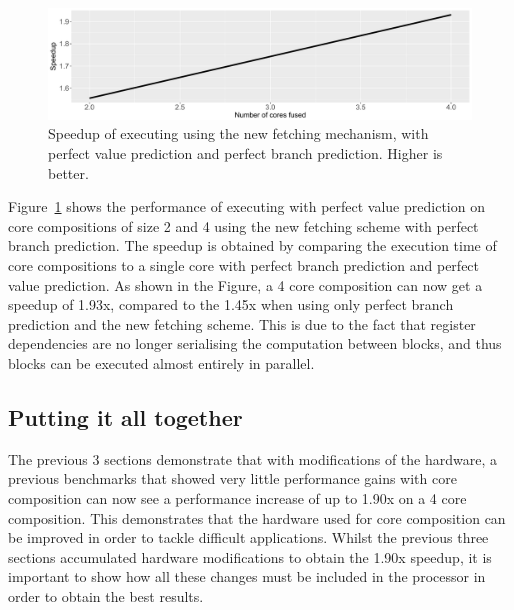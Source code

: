 \begin{figure}[t]
    \centering
    \includegraphics[width=1\textwidth]{chapter3/graphics/mser_fetch_motiv.pdf}

    \caption{Speedup of executing  using the new fetching mechanism, with perfect value prediction and perfect branch prediction. Higher is better.}
    \label{fig:motivation_reg}
	\vspace{1em}
\end{figure}

Figure~\ref{fig:motivation_reg} shows the performance of executing  with perfect value prediction on core compositions of size 2 and 4 using the new fetching scheme with perfect branch prediction.
The speedup is obtained by comparing the execution time of core compositions to a single core with perfect branch prediction and perfect value prediction.
As shown in the Figure, a 4 core composition can now get a speedup of 1.93x, compared to the 1.45x when using only perfect branch prediction and the new fetching scheme.
This is due to the fact that register dependencies are no longer serialising the computation between blocks, and thus blocks can be executed almost entirely in parallel.


\subsection{Putting it all together}

The previous 3 sections demonstrate that with modifications of the hardware, a previous benchmarks that showed very little performance gains with core composition can now see a performance increase of up to 1.90x on a 4 core composition.
This demonstrates that the hardware used for core composition can be improved in order to tackle difficult applications.
Whilst the previous three sections accumulated hardware modifications to obtain the 1.90x speedup, it is important to show how all these changes must be included in the processor in order to obtain the best results.

